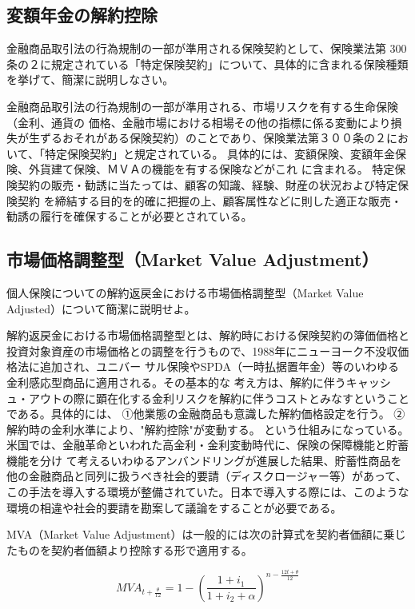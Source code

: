 \documentclass[report,gutter=10mm,fore-edge=10mm,uplatex,dvipdfmx]{jlreq}
\begin{document}
\subsection{変額年金の解約控除}
金融商品取引法の行為規制の一部が準用される保険契約として、保険業法第 300 条の２に規定されている「特定保険契約」について、具体的に含まれる保険種類を挙げて、簡潔に説明しなさい。


金融商品取引法の行為規制の一部が準用される、市場リスクを有する生命保険（金利、通貨の
価格、金融市場における相場その他の指標に係る変動により損失が生ずるおそれがある保険契約）のことであり、保険業法第３００条の２において、「特定保険契約」と規定されている。
具体的には、変額保険、変額年金保険、外貨建て保険、ＭＶＡの機能を有する保険などがこれ
に含まれる。
特定保険契約の販売・勧誘に当たっては、顧客の知識、経験、財産の状況および特定保険契約
を締結する目的を的確に把握の上、顧客属性などに則した適正な販売・勧誘の履行を確保することが必要とされている。

\subsection{市場価格調整型（Market Value Adjustment）}

個人保険についての解約返戻金における市場価格調整型（Market Value Adjusted）について簡潔に説明せよ。


解約返戻金における市場価格調整型とは、解約時における保険契約の簿価価格と投資対象資産の市場価格との調整を行うもので、1988年にニューヨーク不没収価格法に追加され、ユニバー
サル保険やSPDA（一時払据置年金）等のいわゆる金利感応型商品に適用される。その基本的な
考え方は、解約に伴うキャッシュ・アウトの際に顕在化する金利リスクを解約に伴うコストとみなすということである。具体的には、
①他業態の金融商品も意識した解約価格設定を行う。
②解約時の金利水準により、"解約控除"が変動する。
という仕組みになっている。
米国では、金融革命といわれた高金利・金利変動時代に、保険の保障機能と貯蓄機能を分け
て考えるいわゆるアンバンドリングが進展した結果、貯蓄性商品を他の金融商品と同列に扱うべき社会的要請（ディスクロージャー等）があって、この手法を導入する環境が整備されていた。日本で導入する際には、このような環境の相違や社会的要請を勘案して議論をすることが必要である。

MVA（Market Value Adjustment）は一般的には次の計算式を契約者価額に乗じたものを契約者価額より控除する形で適用する。

$$
MVA_{t+\frac{\theta}{12}}=1-(\frac{1+i_1}{1+i_2+\alpha})^{n-\frac{12t+\theta}{12}}
$$
\end{document}
